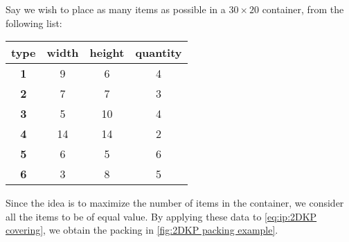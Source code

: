 \begin{example}
    Say we wish to place as many items as possible in a $30 \times 20$ container, from the following list:

    \begin{table}[h]
        \centering
        \begin{tabular}{cccc}
            \textbf{type} & \textbf{width} & \textbf{height} & \textbf{quantity}\\
            \hline
            \textbf{1} & 9 & 6 & 4\\
            \hline
            \textbf{2} & 7 & 7 & 3\\
            \hline
            \textbf{3} & 5 & 10 & 4\\
            \hline
            \textbf{4} & 14 & 14 & 2\\
            \hline
            \textbf{5} & 6 & 5 & 6\\
            \hline
            \textbf{6} & 3 & 8 & 5\\
            \hline
        \end{tabular}
    \end{table}

    Since the idea is to maximize the number of items in the container, we consider all the items to be of equal value. By applying these data to \cref{eq:ip:2DKP covering}, we obtain the packing in \cref{fig:2DKP packing example}.


\end{example}
